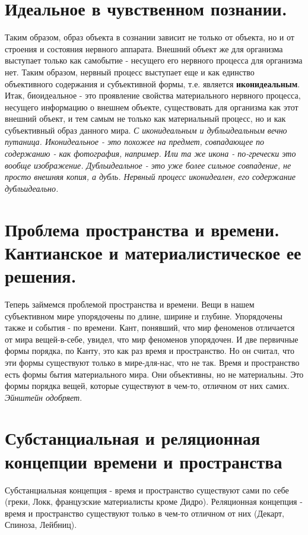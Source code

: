 \section{ Идеальное в чувственном познании.}
Таким образом, образ объекта в сознании зависит не только от объекта, но и от строения и состояния нервного аппарата. Внешний объект же для организма выступает только как самобытие - несущего его нервного процесса для организма нет. Таким образом, нервный процесс выступает еще и как единство объективного содержания и субъективной формы, т.е. является \textbf{иконидеальным}. Итак, биоидеальное - это проявление свойства материального нервного процесса, несущего информацию о  внешнем объекте, существовать для организма как этот внешний объект, и тем самым не только как материальный процесс, но и как субъективный образ данного мира. \textit{С иконидеальным и дубльидеальным вечно путаница. Иконидеальное - это похожее на предмет, совпадающее по содержанию - как фотография, например. Или та  же икона - по-гречески это вообще изображение. Дубльидеальное - это уже более сильное совпадение, не просто внешняя копия, а дубль. Нервный процесс иконидеален, его содержание дубльидеально.}

\section{ Проблема пространства и времени. Кантианское и материалистическое ее решения.}
Теперь займемся проблемой пространства и времени. Вещи в нашем субъективном мире упорядочены по длине, ширине и глубине. Упорядочены также и события - по времени. Кант, понявший, что мир феноменов отличается от мира вещей-в-себе, увидел, что мир феноменов упорядочен. И две первичные формы порядка, по Канту, это как раз время и пространство. Но он считал, что эти формы существуют только в мире-для-нас, что не так. Время и пространство есть формы бытия материального мира. Они объективны, но не материальны. Это формы порядка вещей, которые существуют в чем-то, отличном от них самих. \textit{Эйнштейн одобряет}.

\section{ Субстанциальная и реляционная концепции времени и пространства}
Субстанциальная концепция - время и пространство существуют сами по себе (греки, Локк, французские материалисты кроме Дидро). Реляционная концепция - время и пространство существуют только в чем-то отличном от них (Декарт, Спиноза, Лейбниц).


